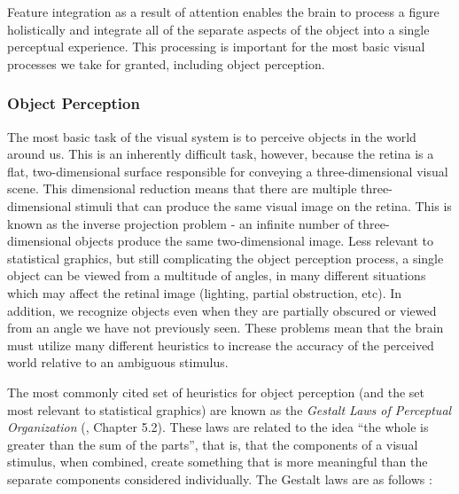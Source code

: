 \documentclass[11pt]{isuthesis}\usepackage[]{graphicx}\usepackage[]{color}
\begin{document}
Feature integration as a result of attention enables the brain to process a figure holistically and integrate all of the separate aspects of the object into a single perceptual experience. This processing is important for the most basic visual processes we take for granted, including object perception. 

\subsubsection{Object Perception} \label{ObjectPerception}
The most basic task of the visual system is to perceive objects in the world around us. This is an inherently difficult task, however, because the retina is a flat, two-dimensional surface responsible for conveying a three-dimensional visual scene. This dimensional reduction means that there are multiple three-dimensional stimuli that can produce the same visual image on the retina. This is known as the inverse projection problem - an infinite number of three-dimensional objects produce the same two-dimensional image. Less relevant to statistical graphics, but still complicating the object perception process, a single object can be viewed from a multitude of angles, in many different situations which may affect the retinal image (lighting, partial obstruction, etc). In addition, we recognize objects even when they are partially obscured or viewed from an angle we have not previously seen. These problems mean that the brain must utilize many different heuristics to increase the accuracy of the perceived world relative to an ambiguous stimulus. 

The most commonly cited set of heuristics for object perception (and the set most relevant to statistical graphics) are known as the \emph{Gestalt Laws of Perceptual Organization} (\citealt{goldstein}, Chapter 5.2). These laws are related to the idea ``the whole is greater than the sum of the parts'', that is, that the components of a visual stimulus, when combined, create something that is more meaningful than the separate components considered individually. The Gestalt laws are as follows \citep{goldstein}: 
\end{document}

